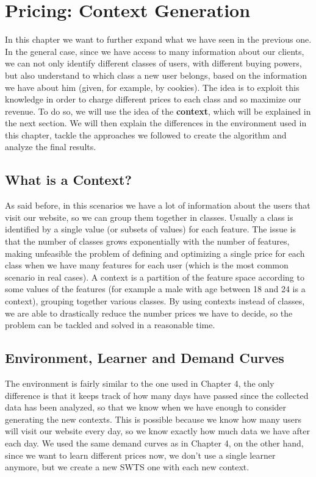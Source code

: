 \chapter{Pricing: Context Generation}\label{ch:pricing:-context-generation}

In this chapter we want to further expand what we have seen in the previous one.
In the general case, since we have access to many information about our clients, we can not only identify different classes of users, with different buying powers, but also understand to which class a new user belongs, based on the information we have about him (given, for example, by cookies).
The idea is to exploit this knowledge in order to charge different prices to each class and so maximize our revenue.
To do so, we will use the idea of the \textbf{context}, which will be explained in the next section.
We will then explain the differences in the environment used in this chapter, tackle the approaches we followed to create the algorithm and analyze the final results.

\section{What is a Context?}\label{sec:what-is-a-context?}
As said before, in this scenarios we have a lot of information about the users that visit our website, so we can group them together in classes.
Usually a class is identified by a single value (or subsets of values) for each feature.
The issue is that the number of classes grows exponentially with the number of features, making unfeasible the problem of defining and optimizing a single price for each class when we have many features for each user (which is the most common scenario in real cases).
A context is a partition of the feature space according to some values of the features (for example a male with age between 18 and 24 is a context), grouping together various classes.
By using contexts instead of classes, we are able to drastically reduce the number prices we have to decide, so the problem can be tackled and solved in a reasonable time.

\section{Environment, Learner and Demand Curves}\label{sec:environment,-learner-and-demand-curves}
The environment is fairly similar to the one used in Chapter 4, the only difference is that it keeps track of how many days have passed since the collected data has been analyzed, so that we know when we have enough to consider generating the new contexts.
This is possible because we know how many users will visit our website every day, so we know exactly how much data we have after each day.
We used the same demand curves as in Chapter 4, on the other hand, since we want to learn different prices now, we don't use a single learner anymore, but we create a new SWTS one with each new context.

